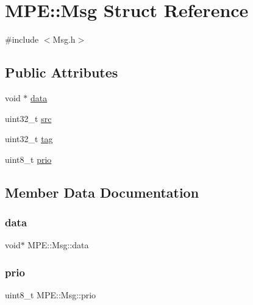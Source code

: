 \hypertarget{struct_m_p_e_1_1_msg}{}\section{M\+PE\+:\+:Msg Struct Reference}
\label{struct_m_p_e_1_1_msg}


{\ttfamily \#include $<$Msg.\+h$>$}

\subsection*{Public Attributes}
\begin{DoxyCompactItemize}
\item 
void $\ast$ \hyperlink{struct_m_p_e_1_1_msg_afd324f2a137a0ecfffdb3cc46703184f}{data}
\item 
uint32\+\_\+t \hyperlink{struct_m_p_e_1_1_msg_a5fd5790137b7e5916b13c7a5375cc6f3}{src}
\item 
uint32\+\_\+t \hyperlink{struct_m_p_e_1_1_msg_a04b1b5fb0cdbb84226609f15d621e21b}{tag}
\item 
uint8\+\_\+t \hyperlink{struct_m_p_e_1_1_msg_a6866bacef848a944fd3b33f88cfedcc4}{prio}
\end{DoxyCompactItemize}


\subsection{Member Data Documentation}
\mbox{\label{struct_m_p_e_1_1_msg_afd324f2a137a0ecfffdb3cc46703184f}} 
\subsubsection{\texorpdfstring{data}{data}}
{\footnotesize\ttfamily void$\ast$ M\+P\+E\+::\+Msg\+::data}

\mbox{\label{struct_m_p_e_1_1_msg_a6866bacef848a944fd3b33f88cfedcc4}} 
\subsubsection{\texorpdfstring{prio}{prio}}
{\footnotesize\ttfamily uint8\+\_\+t M\+P\+E\+::\+Msg\+::prio}

